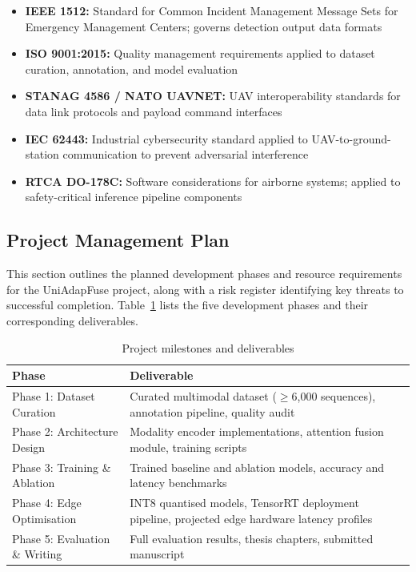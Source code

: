 \documentclass[journal]{IEEEtran}
\begin{document}
\begin{itemize}
    \item \textbf{IEEE 1512:} Standard for Common Incident Management Message Sets for Emergency Management Centers; governs detection output data formats
    \item \textbf{ISO 9001:2015:} Quality management requirements applied to dataset curation, annotation, and model evaluation
    \item \textbf{STANAG 4586 / NATO UAVNET:} UAV interoperability standards for data link protocols and payload command interfaces
    \item \textbf{IEC 62443:} Industrial cybersecurity standard applied to UAV-to-ground-station communication to prevent adversarial interference
    \item \textbf{RTCA DO-178C:} Software considerations for airborne systems; applied to safety-critical inference pipeline components
\end{itemize}

\subsection{Project Management Plan}

This section outlines the planned development phases and resource requirements for the UniAdapFuse project, along with a risk register identifying key threats to successful completion. Table~\ref{tab:project_schedule} lists the five development phases and their corresponding deliverables.

\begin{table}[!t]
\centering
\caption{Project milestones and deliverables}
\label{tab:project_schedule}
\begin{tabular}{@{}lp{8cm}@{}}
\toprule
\textbf{Phase} & \textbf{Deliverable} \\
\midrule
Phase 1: Dataset Curation      & Curated multimodal dataset ($\geq$6,000 sequences), annotation pipeline, quality audit \\
Phase 2: Architecture Design   & Modality encoder implementations, attention fusion module, training scripts \\
Phase 3: Training \& Ablation  & Trained baseline and ablation models, accuracy and latency benchmarks \\
Phase 4: Edge Optimisation     & INT8 quantised models, TensorRT deployment pipeline, projected edge hardware latency profiles \\
Phase 5: Evaluation \& Writing & Full evaluation results, thesis chapters, submitted manuscript \\
\bottomrule
\end{tabular}
\end{table}
\end{document}
